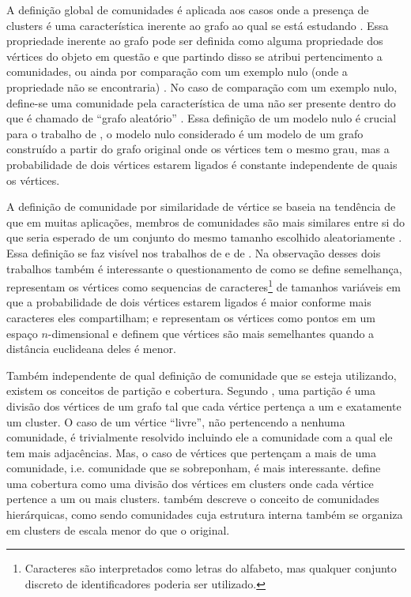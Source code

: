 \documentclass[notes.tex]{subfiles}
\begin{document}
A definição global de comunidades é aplicada aos casos onde a presença de clusters é uma característica inerente ao grafo ao qual se está estudando \cite{fortunato2010community}.
Essa propriedade inerente ao grafo pode ser definida como alguma propriedade dos vértices do objeto em questão e que partindo disso se atribui pertencimento a comunidades, ou ainda por comparação com um exemplo nulo (onde a propriedade não se encontraria) \cite{fortunato2010community}.
No caso de comparação com um exemplo nulo, define-se uma comunidade pela característica de uma não ser presente dentro do que é chamado de ``grafo aleatório'' \cite{fortunato2010community}.
Essa definição de um modelo nulo é crucial para o trabalho de , o modelo nulo considerado é um modelo de um grafo construído a partir do grafo original onde os vértices tem o mesmo grau, mas a probabilidade de dois vértices estarem ligados é constante independente de quais os vértices.

A definição de comunidade por similaridade de vértice se baseia na tendência de que em muitas aplicações, membros de comunidades são mais similares entre si do que seria esperado de um conjunto do mesmo tamanho escolhido aleatoriamente \cite{fortunato2010community}.
Essa definição se faz visível nos trabalhos de  e de .
Na observação desses dois trabalhos também é interessante o questionamento de como se define semelhança,  representam os vértices como sequencias de caracteres\footnote{Caracteres são interpretados como letras do alfabeto, mas qualquer conjunto discreto de identificadores poderia ser utilizado.} de tamanhos variáveis em que a probabilidade de dois vértices estarem ligados é maior conforme mais caracteres eles compartilham; e  representam os vértices como pontos em um espaço $n$-dimensional e definem que vértices são mais semelhantes quando a distância euclideana deles é menor.

Também independente de qual definição de comunidade que se esteja utilizando, existem os conceitos de partição e cobertura.
Segundo , uma partição é uma divisão dos vértices de um grafo tal que cada vértice pertença a um e exatamente um cluster.
O caso de um vértice ``livre'', não pertencendo a nenhuma comunidade, é trivialmente resolvido incluindo ele a comunidade com a qual ele tem mais adjacências.
Mas, o caso de vértices que pertençam a mais de uma comunidade, i.e. comunidade que se sobreponham, é mais interessante.
 define uma cobertura como uma divisão dos vértices em clusters onde cada vértice pertence a um ou mais clusters.
 também descreve o conceito de comunidades hierárquicas, como sendo comunidades cuja estrutura interna também se organiza em clusters de escala menor do que o original.
\end{document}
